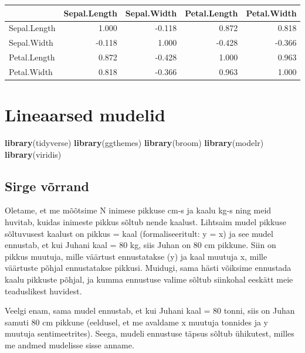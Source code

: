 \documentclass[]{book}
\newenvironment{Shaded}{\begin{snugshade}}{\end{snugshade}}
\newcommand{\KeywordTok}[1]{\textcolor[rgb]{0.13,0.29,0.53}{\textbf{#1}}}
\newcommand{\NormalTok}[1]{#1}
\begin{document}
\begin{tabular}{l|r|r|r|r}
\hline
  & Sepal.Length & Sepal.Width & Petal.Length & Petal.Width\\
\hline
Sepal.Length & 1.000 & -0.118 & 0.872 & 0.818\\
\hline
Sepal.Width & -0.118 & 1.000 & -0.428 & -0.366\\
\hline
Petal.Length & 0.872 & -0.428 & 1.000 & 0.963\\
\hline
Petal.Width & 0.818 & -0.366 & 0.963 & 1.000\\
\hline
\end{tabular}

\hypertarget{lineaarsed-mudelid}{%
\chapter{Lineaarsed mudelid}\label{lineaarsed-mudelid}}

\begin{Shaded}
\begin{Highlighting}[]
\KeywordTok{library}\NormalTok{(tidyverse)}
\KeywordTok{library}\NormalTok{(ggthemes)}
\KeywordTok{library}\NormalTok{(broom)}
\KeywordTok{library}\NormalTok{(modelr)}
\KeywordTok{library}\NormalTok{(viridis)}
\end{Highlighting}
\end{Shaded}

\hypertarget{sirge-vorrand}{%
\section{Sirge võrrand}\label{sirge-vorrand}}

Oletame, et me mõõtsime N inimese pikkuse cm-s ja kaalu kg-s ning meid huvitab, kuidas inimeste pikkus sõltub nende kaalust.
Lihtsaim mudel pikkuse sõltuvusest kaalust on pikkus = kaal (formaliseeritult: y = x) ja see mudel ennustab, et kui Juhani kaal = 80 kg, siis Juhan on 80 cm pikkune.
Siin on pikkus muutuja, mille väärtust ennustatakse (y) ja kaal muutuja x, mille väärtuste põhjal ennustatakse pikkusi. Muidugi, sama hästi võiksime ennustada kaalu pikkuste põhjal, ja kumma ennustuse valime sõltub siinkohal eeskätt meie teaduslikest huvidest.

Veelgi enam, sama mudel ennustab, et kui Juhani kaal = 80 tonni, siis on Juhan samuti 80 cm pikkune (eeldusel, et me avaldame x muutuja tonnides ja y muutuja sentimeetrites). Seega, mudeli ennustuse täpsus sõltub ühikutest, milles me andmed mudelisse sisse anname.
\end{document}
